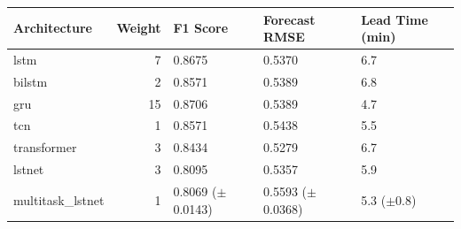 \begin{tabular}{lrlll}
\toprule
Architecture & Weight & F1 Score & Forecast RMSE & Lead Time (min) \\
\midrule
lstm & 7 & 0.8675 & 0.5370 & 6.7 \\
bilstm & 2 & 0.8571 & 0.5389 & 6.8 \\
gru & 15 & 0.8706 & 0.5389 & 4.7 \\
tcn & 1 & 0.8571 & 0.5438 & 5.5 \\
transformer & 3 & 0.8434 & 0.5279 & 6.7 \\
lstnet & 3 & 0.8095 & 0.5357 & 5.9 \\
multitask_lstnet & 1 & 0.8069 ($\pm$0.0143) & 0.5593 ($\pm$0.0368) & 5.3 ($\pm$0.8) \\
\bottomrule
\end{tabular}
